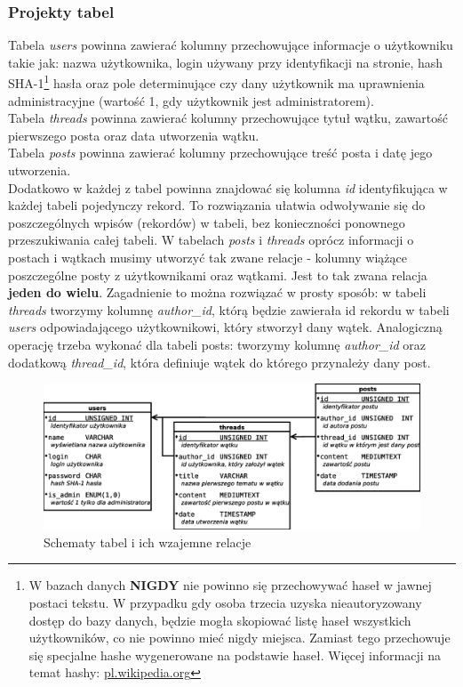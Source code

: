 \documentclass[a4paper,10pt]{article}
\begin{document}
\subsubsection{Projekty tabel}
Tabela \textit{users} powinna zawierać kolumny przechowujące informacje o użytkowniku takie jak: nazwa użytkownika, login używany przy identyfikacji na stronie, hash SHA-1\footnote{W bazach danych \textbf{NIGDY} nie powinno się przechowywać haseł w jawnej postaci tekstu. W przypadku gdy osoba trzecia uzyska nieautoryzowany dostęp do bazy danych, będzie mogła skopiować listę haseł wszystkich użytkowników, co nie powinno mieć nigdy miejsca. Zamiast tego przechowuje się specjalne hashe wygenerowane na podstawie haseł. Więcej informacji na temat hashy: \href{http://pl.wikipedia.org/wiki/Funkcja_skrótu}{pl.wikipedia.org}} hasła oraz pole determinujące czy dany użytkownik ma uprawnienia administracyjne (wartość 1, gdy użytkownik jest administratorem). \\
Tabela \textit{threads} powinna zawierać kolumny przechowujące tytuł wątku, zawartość pierwszego posta oraz data utworzenia wątku. \\
Tabela \textit{posts} powinna zawierać kolumny przechowujące treść posta i datę jego utworzenia. \\
Dodatkowo w każdej z tabel powinna znajdować się kolumna \textit{id} identyfikująca w każdej tabeli pojedynczy rekord. To rozwiązania ułatwia odwoływanie się do poszczególnych wpisów (rekordów)  w tabeli, bez konieczności ponownego przeszukiwania całej tabeli.
W tabelach \textit{posts} i  \textit{threads} oprócz informacji o postach i wątkach musimy utworzyć tak zwane relacje - kolumny wiążące poszczególne posty z użytkownikami oraz wątkami. Jest to tak zwana relacja \textbf{jeden do wielu}. Zagadnienie to można rozwiązać w prosty sposób: w tabeli \textit{threads} tworzymy kolumnę \textit{author\_id}, którą będzie zawierała id rekordu w tabeli \textit{users} odpowiadającego użytkownikowi, który stworzył dany wątek. Analogiczną operację trzeba wykonać dla tabeli posts: tworzymy kolumnę \textit{author\_id} oraz dodatkową \textit{thread\_id}, która definiuje wątek do którego przynależy dany post.

\begin{figure}[htbp]
\centering
\includegraphics[width=1\textwidth]{db.eps}
\caption{Schematy tabel i ich wzajemne relacje}
\end{figure}
\end{document}
